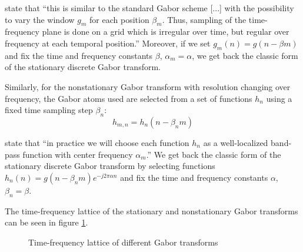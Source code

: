 \documentclass[letter,12pt]{article}
\begin{document}
\citet{balazs} state that ``this is similar to the standard Gabor scheme [...] with the possibility to vary the window $g_{m}$ for each position $\beta_{m}$. Thus, sampling of the time-frequency plane is done on a grid which is irregular over time, but regular over frequency at each temporal position.'' Moreover, if we set $g_{m}(n) = g(n - \beta m)$ and fix the time and frequency constants $\beta$, $\alpha_{m} = \alpha$, we get back the classic form of the stationary discrete Gabor transform.

Similarly, for the nonstationary Gabor transform with resolution changing over frequency, the Gabor atoms used are selected from a set of functions $h_{n}$ using a fixed time sampling step $\beta_{n}$:
\[ h_{m,n} = h_{n}(n - \beta_{n}m) \]

\citet{balazs} state that ``in practice we will choose each function $h_{n}$ as a well-localized band-pass function with center frequency $\alpha_{m}$.'' We get back the classic form of the stationary discrete Gabor transform by selecting functions $h_{n}(n) = g(n - \beta_{n} m)e^{-j2\pi \alpha n}$ and fix the time and frequency constants $\alpha$, $\beta_{n} = \beta$.

The time-frequency lattice of the stationary and nonstationary Gabor transforms can be seen in figure \ref{fig:nsgts}.

\begin{figure}[ht]
	\centering
	\hspace{0.35em}
	\hspace{0.35em}
	\caption{Time-frequency lattice of different Gabor transforms}
	\label{fig:nsgts}
\end{figure}
\end{document}
